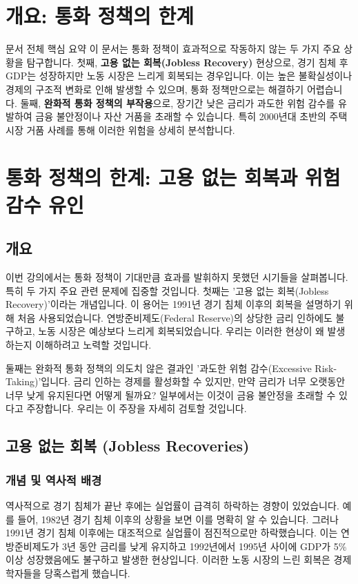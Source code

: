 \documentclass[11pt,a4paper]{article}
\begin{document}
\newpage

\newpage
\section*{개요: 통화 정책의 한계}

\begin{summarybox}{문서 전체 핵심 요약}
이 문서는 통화 정책이 효과적으로 작동하지 않는 두 가지 주요 상황을 탐구합니다.
첫째, \textbf{고용 없는 회복(Jobless Recovery)} 현상으로, 경기 침체 후 GDP는 성장하지만 노동 시장은 느리게 회복되는 경우입니다.
이는 높은 불확실성이나 경제의 구조적 변화로 인해 발생할 수 있으며, 통화 정책만으로는 해결하기 어렵습니다.
둘째, \textbf{완화적 통화 정책의 부작용}으로, 장기간 낮은 금리가 과도한 위험 감수를 유발하여 금융 불안정이나 자산 거품을 초래할 수 있습니다.
특히 2000년대 초반의 주택 시장 거품 사례를 통해 이러한 위험을 상세히 분석합니다.
\end{summarybox}

\newpage
\section{통화 정책의 한계: 고용 없는 회복과 위험 감수 유인}

\subsection{개요}
이번 강의에서는 통화 정책이 기대만큼 효과를 발휘하지 못했던 시기들을 살펴봅니다. 특히 두 가지 주요 관련 문제에 집중할 것입니다. 첫째는 '고용 없는 회복(Jobless Recovery)'이라는 개념입니다. 이 용어는 1991년 경기 침체 이후의 회복을 설명하기 위해 처음 사용되었습니다. 연방준비제도(Federal Reserve)의 상당한 금리 인하에도 불구하고, 노동 시장은 예상보다 느리게 회복되었습니다. 우리는 이러한 현상이 왜 발생하는지 이해하려고 노력할 것입니다.

둘째는 완화적 통화 정책의 의도치 않은 결과인 '과도한 위험 감수(Excessive Risk-Taking)'입니다. 금리 인하는 경제를 활성화할 수 있지만, 만약 금리가 너무 오랫동안 너무 낮게 유지된다면 어떻게 될까요? 일부에서는 이것이 금융 불안정을 초래할 수 있다고 주장합니다. 우리는 이 주장을 자세히 검토할 것입니다.

\subsection{고용 없는 회복 (Jobless Recoveries)}

\subsubsection{개념 및 역사적 배경}
역사적으로 경기 침체가 끝난 후에는 실업률이 급격히 하락하는 경향이 있었습니다. 예를 들어, 1982년 경기 침체 이후의 상황을 보면 이를 명확히 알 수 있습니다. 그러나 1991년 경기 침체 이후에는 대조적으로 실업률이 점진적으로만 하락했습니다. 이는 연방준비제도가 3년 동안 금리를 낮게 유지하고 1992년에서 1995년 사이에 GDP가 5\% 이상 성장했음에도 불구하고 발생한 현상입니다. 이러한 노동 시장의 느린 회복은 경제학자들을 당혹스럽게 했습니다.
\end{document}
